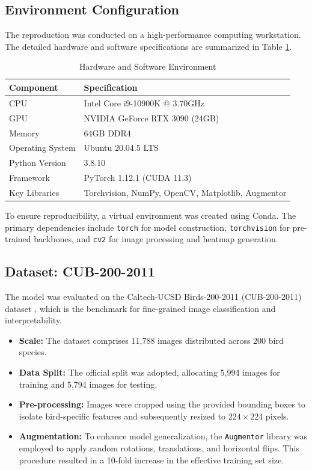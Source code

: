 \documentclass[conference]{IEEEtran}
\begin{document}
\subsection{Environment Configuration}
The reproduction was conducted on a high-performance computing workstation. The detailed hardware and software specifications are summarized in Table \ref{tab:environment}.

\begin{table}[t]
\centering
\caption{Hardware and Software Environment}
\label{tab:environment}
\footnotesize 
\begin{tabular}{lp{4.5cm}} 
\hline
\textbf{Component} & \textbf{Specification} \\ \hline
CPU                & Intel Core i9-10900K @ 3.70GHz \\
GPU                & NVIDIA GeForce RTX 3090 (24GB) \\
Memory             & 64GB DDR4 \\
Operating System   & Ubuntu 20.04.5 LTS \\
Python Version     & 3.8.10 \\
Framework          & PyTorch 1.12.1 (CUDA 11.3) \\
Key Libraries      & Torchvision, NumPy, OpenCV, Matplotlib, Augmentor \\ \hline
\end{tabular}
\end{table}

To ensure reproducibility, a virtual environment was created using Conda. The primary dependencies include \texttt{torch} for model construction, \texttt{torchvision} for pre-trained backbones, and \texttt{cv2} for image processing and heatmap generation.

\subsection{Dataset: CUB-200-2011}
The model was evaluated on the Caltech-UCSD Birds-200-2011 (CUB-200-2011) dataset \cite{b10}, which is the benchmark for fine-grained image classification and interpretability.

\begin{itemize}
    \item \textbf{Scale:} The dataset comprises 11,788 images distributed across 200 bird species.
    \item \textbf{Data Split:} The official split was adopted, allocating 5,994 images for training and 5,794 images for testing.
    \item \textbf{Pre-processing:} Images were cropped using the provided bounding boxes to isolate bird-specific features and subsequently resized to $224 \times 224$ pixels.
    \item \textbf{Augmentation:} To enhance model generalization, the \texttt{Augmentor} library was employed to apply random rotations, translations, and horizontal flips. This procedure resulted in a 10-fold increase in the effective training set size.
\end{itemize}
\end{document}

